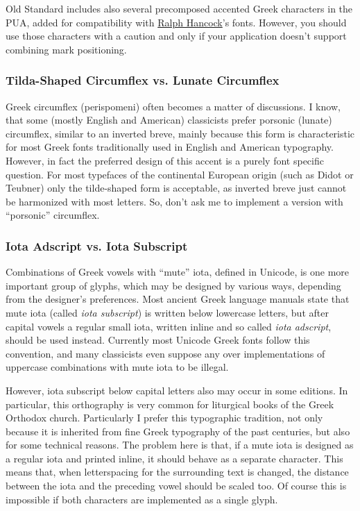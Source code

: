 \documentclass[12pt,a4paper,openany]{book}
\begin{document}
Old Standard includes also several precomposed accented Greek characters in
the PUA, added for compatibility with
\href{http://www.users.dircon.co.uk/~hancock/index.htm}{Ralph Hancock}’s
fonts. However, you should use those characters with a caution and only if
your application doesn’t support combining mark positioning.

\subsubsection{Tilda-Shaped Circumflex vs. Lunate Circumflex}

Greek circumflex (perispomeni) often becomes a matter of discussions. I
know, that some (mostly English and American) classicists prefer porsonic
(lunate) circumflex, similar to an inverted breve, mainly because this form is
characteristic for most Greek fonts traditionally used in English and
American typography. However, in fact the preferred design of this accent
is a purely font specific question. For most typefaces of the continental
European origin (such as Didot or Teubner) only the tilde-shaped form is
acceptable, as inverted breve just cannot be harmonized with most letters.
So, don’t ask me to implement a version with “porsonic” circumflex.

\subsubsection{Iota Adscript vs. Iota Subscript}

Combinations of Greek vowels with “mute” iota, defined in Unicode, is one
more important group of glyphs, which may be designed by various ways,
depending from the designer’s preferences. Most ancient Greek language
manuals state that mute iota (called \textit{iota subscript}) is written
below lowercase letters, but after capital vowels a regular small iota,
written inline and so called \textit{iota adscript}, should be used
instead.  Currently most Unicode Greek fonts follow this convention, and
many classicists even suppose any over implementations of uppercase
combinations with mute iota to be illegal.

However, iota subscript below capital letters also may occur in some
editions. In particular, this orthography is very common for liturgical
books of the Greek Orthodox church. Particularly I prefer this typographic
tradition, not only because it is inherited from fine Greek typography of
the past centuries, but also for some technical reasons. The problem here
is that, if a mute iota is designed as a regular iota and printed inline,
it should behave as a separate character. This means that, when
letterspacing for the surrounding text is changed, the distance between the
iota and the preceding vowel should be scaled too. Of course this is
impossible if both characters are implemented as a single glyph.
\end{document}
